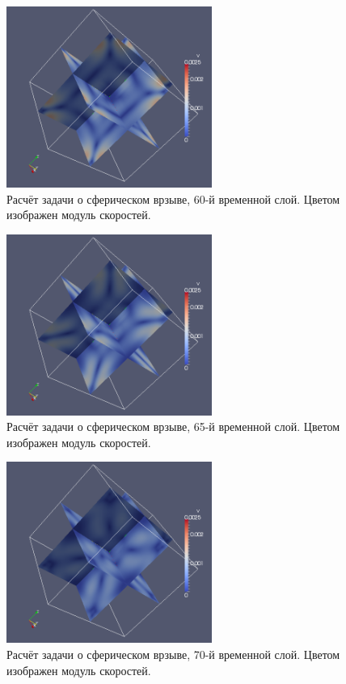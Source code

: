 \begin{figure}[htp]
\centering
\includegraphics[width=0.6\textwidth]{png/spherical-explosion-test/v-scalar/0060.png}
\caption{Расчёт задачи о сферическом врзыве, 60-й временной слой. Цветом изображен модуль скоростей.}
\end{figure}

\begin{figure}[htp]
\centering
\includegraphics[width=0.6\textwidth]{png/spherical-explosion-test/v-scalar/0065.png}
\caption{Расчёт задачи о сферическом врзыве, 65-й временной слой. Цветом изображен модуль скоростей.}
\end{figure}

\begin{figure}[htp]
\centering
\includegraphics[width=0.6\textwidth]{png/spherical-explosion-test/v-scalar/0070.png}
\caption{Расчёт задачи о сферическом врзыве, 70-й временной слой. Цветом изображен модуль скоростей.}
\label{pic:spherical_70}
\end{figure}

